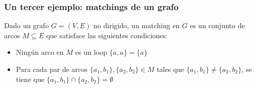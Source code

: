 \documentclass{beamer}
\newcommand{\vs}[1]{\vspace{#1mm}}
\begin{document}
	
	
	
	
	\begin{frame}
		\frametitle{Un tercer ejemplo: matchings de un grafo}
		
		{\small
			Dado un grafo $G=(V,E)$ no dirigido, un matching en $G$ es un conjunto de arcos $M \subseteq E$ que satisface las siguientes condiciones:
			\begin{itemize}
				\item Ningún arco en $M$ es un loop $\{a,a\} = \{a\}$
				
				\item Para cada par de arcos $\{a_1,b_1\}, \{a_2, b_2\} \in M$ tales que $\{a_1,b_1\} \neq \{a_2,b_2\}$, se tiene que $\{a_1,b_1\} \cap \{a_2,b_2\} = \emptyset$
			\end{itemize}
			
		}
	\end{frame}
	
\end{document}
